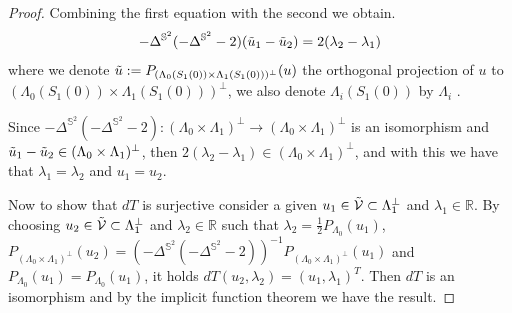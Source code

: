 \documentclass[10pt,a4paper]{amsart}
\begin{document}
\begin{proof}
Combining the first equation with the second we obtain.
$$   -\Delta^{\mathbb{S}^2} (- \Delta^{\mathbb{S}^2} -2) (\Tilde{u}_1- \Tilde{u}_2) = 2(\lambda_2 -\lambda_1) $$
where we denote $\Tilde{u}:=P_{(\Lambda_0(S_1(0)) \times \Lambda_1(S_1(0)))^\bot}(u) $ the orthogonal projection of $u$ to $(\Lambda_0(S_1(0)) \times \Lambda_1(S_1(0)))^\bot$, we also denote $\Lambda_i(S_1(0))$  by $\Lambda_i$ .

 Since $-\Delta^{\mathbb{S}^2} (- \Delta^{\mathbb{S}^2} -2):(\Lambda_0 \times \Lambda_1)^\bot \to (\Lambda_0 \times \Lambda_1)^\bot $ is an isomorphism and $\Tilde{u}_1- \Tilde{u}_2 \in (\Lambda_0 \times \Lambda_1)^\bot $, then $2(\lambda_2 -\lambda_1) \in (\Lambda_0 \times \Lambda_1)^\bot$, and with this we have  that $\lambda_1= \lambda_2$ and $u_1 =u_2 $. 

 Now to show that  $dT$ is surjective  consider a given  $u_1 \in  \Tilde{\mathcal{V}} \subset \Lambda_1^\bot $ and $ \lambda_1 \in \mathbb{R} $.  By choosing  $u_2 \in  \Tilde{\mathcal{V}} \subset \Lambda_1^\bot $ and $ \lambda_2 \in \mathbb{R} $ such that  $\lambda_2 = \frac{1}{2} P_{\Lambda_0}(u_1) $,  $P_{(\Lambda_0 \times \Lambda_1)^\bot}(u_2)=(-\Delta^{\mathbb{S}^2} (- \Delta^{\mathbb{S}^2} -2))^{-1} P_{(\Lambda_0 \times \Lambda_1)^\bot}(u_1) $ and  $P_{\Lambda_0}(u_1)=P_{\Lambda_0}(u_1)$, it holds $dT(u_2,\lambda_2)= (u_1,\lambda_1)^T$. Then $dT$ is an isomorphism and by the implicit function theorem we have the result.
\end{proof}
\end{document}
